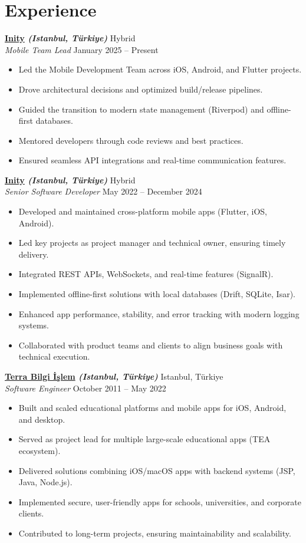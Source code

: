 \documentclass[10pt,a4paper]{extarticle}
\begin{document}
\section{Experience}
\textbf{\href{https://inity.com.tr}{Inity} \textit{(Istanbul, Türkiye)}} \hfill Hybrid\\
\textit{Mobile Team Lead} \hfill January 2025 -- Present
\begin{itemize}[leftmargin=*,noitemsep,topsep=0pt]
    \item Led the Mobile Development Team across iOS, Android, and Flutter projects.
	\item Drove architectural decisions and optimized build/release pipelines.
	\item Guided the transition to modern state management (Riverpod) and offline-first databases.
	\item Mentored developers through code reviews and best practices.
	\item Ensured seamless API integrations and real-time communication features.
\end{itemize}
\textbf{\href{https://inity.com.tr}{Inity} \textit{(Istanbul, Türkiye)}} \hfill Hybrid\\
\textit{Senior Software Developer} \hfill May 2022 -- December 2024
\begin{itemize}[leftmargin=*,noitemsep,topsep=0pt]
    \item Developed and maintained cross-platform mobile apps (Flutter, iOS, Android).
	\item Led key projects as project manager and technical owner, ensuring timely delivery.
	\item Integrated REST APIs, WebSockets, and real-time features (SignalR).
	\item Implemented offline-first solutions with local databases (Drift, SQLite, Isar).
	\item Enhanced app performance, stability, and error tracking with modern logging systems.
	\item Collaborated with product teams and clients to align business goals with technical execution.
\end{itemize}
\textbf{\href{https://www.terrabilgiisilem}{Terra Bilgi İşlem} \textit{(Istanbul, Türkiye)}} \hfill Istanbul, Türkiye\\
\textit{Software Engineer} \hfill October 2011 -- May 2022
\begin{itemize}[leftmargin=*,noitemsep,topsep=0pt]
    \item Built and scaled educational platforms and mobile apps for iOS, Android, and desktop.
	\item Served as project lead for multiple large-scale educational apps (TEA ecosystem).
	\item Delivered solutions combining iOS/macOS apps with backend systems (JSP, Java, Node.js).
	\item Implemented secure, user-friendly apps for schools, universities, and corporate clients.
	\item Contributed to long-term projects, ensuring maintainability and scalability.
\end{itemize}
\end{document}
